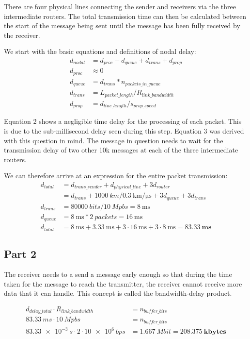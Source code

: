 \documentclass[12pt,letterpaper]{article}
\begin{document}
There are four physical lines connecting the sender and receivers via the three
intermediate routers. The total transmission time can then be calculated between
the start of the message being sent until the message has been fully received by
the receiver.

We start with the basic equations and definitions of nodal delay:
\begin{align}
d_{nodal} &= d_{proc} + d_{queue} + d_{trans} + d_{prop} \\
d_{proc} &\approx 0 \\
d_{queue} &= d_{trans} * n_{packets\_in\_queue} \\
d_{trans} &= L_{packet\_length} / R_{link\_bandwidth} \\
d_{prop} &= d_{line\_length} / s_{prop\_speed} 
\end{align}

Equation 2 shows a negligible time delay for the processing of each packet. This
is due to the sub-millisecond delay seen during this step.
Equation 3 was derived with this question in mind. The message in question needs
to wait for the transmission delay of two other 10k messages at each of the three
intermediate routers.

We can therefore arrive at an expression for the entire packet transmission:
\begin{align*}
d_{total} &= d_{trans\_sender} + d_{physical\_line} + 3d_{router} \\
&= d_{trans} + \SI{1000}{km}/\SI{0.3}{\km\per\us} + 3d_{queue} + 3d_{trans} \\
d_{trans} &= \SI{80000}{bits} / \SI{10}{Mpbs} = \SI{8}{\ms} \\
d_{queue} &= \SI{8}{\ms} * \SI{2}{packets} = \SI{16}{\ms} \\
d_{total} &= \SI{8}{\ms} + \SI{3.33}{\ms} + 3\cdot\SI{16}{\ms} + 3\cdot\SI{8}{\ms} = \pmb{\SI{83.33}{\ms}}
\end{align*}

\subsection*{Part 2}
The receiver needs to a send a message early enough so that during the time
taken for the message to reach the transmitter, the receiver cannot receive
more data that it can handle. This concept is called the bandwidth-delay product.

\begin{align*}
d_{delay\_total} \cdot R_{link\_bandwidth} &= n_{buffer\_bits} \\
\SI{83.33}{ms} \cdot \SI{10}{Mpbs} &= n_{buffer\_bits} \\
\SI{83.33e-3}{s} \cdot 2 \cdot \SI{10e6}{bps} &= \SI{1.667}{Mbit} = \pmb{\SI{208.375}{kbytes}}
\end{align*}
\end{document}
